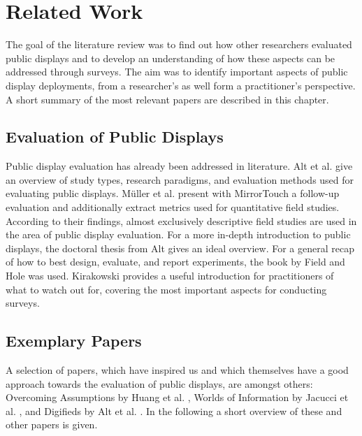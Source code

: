 \section{Related Work}
\label{chapter:related-work}

	The goal of the literature review was to find out how other researchers evaluated public displays and to develop an understanding of how these aspects can be addressed through surveys. The aim was to identify important aspects of public display deployments, from a researcher's as well form a practitioner's perspective. A short summary of the most relevant papers are described in this chapter.


	\subsection{Evaluation of Public Displays} %

	Public display evaluation has already been addressed in literature. Alt et al. \cite{Alt2012HowToEvaluate} give an overview of study types, research paradigms, and evaluation methods used for evaluating public displays. M{\"u}ller et al. \cite{muller2014mirrortouch} present with MirrorTouch a follow-up evaluation and additionally extract metrics used for quantitative field studies. According to their findings, almost exclusively descriptive field studies are used in the area of public display evaluation. For a more in-depth introduction to public displays, the doctoral thesis from Alt \cite{alt2013thesis} gives an ideal overview.
	For a general recap of how to best design, evaluate, and report experiments, the book by Field and Hole \cite{field2003design} was used. Kirakowski \cite{kirakowski2000questionnaireFAQ} provides a useful introduction for practitioners of what to watch out for, covering the most important aspects for conducting surveys.




	\subsection{Exemplary Papers}

	A selection of papers, which have inspired us and which themselves have a good approach towards the evaluation of public displays, are amongst others: Overcoming Assumptions by Huang et al. \cite{huang2008overcoming}, Worlds of Information by Jacucci et al. \cite{jacucci2010worldsofinformation}, and Digifieds by Alt et al. \cite{alt2011digifieds}. In the following a short overview of these and other papers is given.


